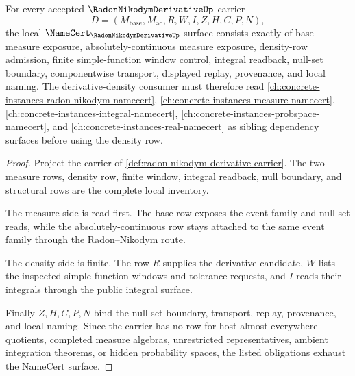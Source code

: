 \begin{theorem}
\label{thm:radon-nikodym-derivative-namecert-obligations}
For every accepted $\RadonNikodymDerivativeUp$ carrier
$$
D=(M_{\mathrm{base}},M_{\mathrm{ac}},R,W,I,Z,H,C,P,N),
$$
the local $\NameCert_{\RadonNikodymDerivativeUp}$ surface consists exactly of base-measure exposure, absolutely-continuous measure exposure, density-row admission, finite simple-function window control, integral readback, null-set boundary, componentwise transport, displayed replay, provenance, and local naming. The derivative-density consumer must therefore read \autoref{ch:concrete-instances-radon-nikodym-namecert}, \autoref{ch:concrete-instances-measure-namecert}, \autoref{ch:concrete-instances-integral-namecert}, \autoref{ch:concrete-instances-probspace-namecert}, and \autoref{ch:concrete-instances-real-namecert} as sibling dependency surfaces before using the density row.
\end{theorem}
\begin{proof}
Project the carrier of \autoref{def:radon-nikodym-derivative-carrier}. The two measure rows, density row, finite window, integral readback, null boundary, and structural rows are the complete local inventory.

The measure side is read first. The base row exposes the event family and null-set reads, while the absolutely-continuous row stays attached to the same event family through the Radon--Nikodym route.

The density side is finite. The row $R$ supplies the derivative candidate, $W$ lists the inspected simple-function windows and tolerance requests, and $I$ reads their integrals through the public integral surface.

Finally $Z,H,C,P,N$ bind the null-set boundary, transport, replay, provenance, and local naming. Since the carrier has no row for host almost-everywhere quotients, completed measure algebras, unrestricted representatives, ambient integration theorems, or hidden probability spaces, the listed obligations exhaust the NameCert surface.
\end{proof}

